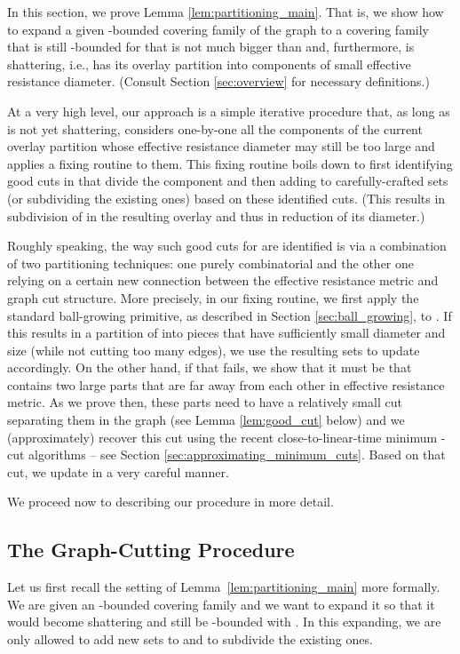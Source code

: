 \documentclass[11pt, letterpaper]{article}
\begin{document}
In this section, we prove Lemma \ref{lem:partitioning_main}. That is, we show how to expand a given -bounded covering family  of the graph  to a covering family  that is still -bounded for  that is not much bigger than  and, furthermore, is shattering, i.e., has its overlay  partition  into components of small effective resistance diameter. (Consult Section \ref{sec:overview} for necessary definitions.)

At a very high level, our approach is a simple iterative procedure that, as long as  is not yet shattering, considers one-by-one all the components  of the current overlay partition  whose effective resistance diameter may still be too large and applies a fixing routine to them. This fixing routine boils down to first identifying good cuts in  that divide the component  and then adding to  carefully-crafted sets (or subdividing the existing ones) based on these identified cuts. (This results in subdivision of  in the resulting overlay  and thus in reduction of its diameter.)

Roughly speaking, the way such good cuts for  are identified is via a combination of two partitioning techniques: one purely combinatorial and the other one relying on a certain new connection between the effective resistance metric and graph cut structure. More precisely, in our fixing routine, we first apply the standard ball-growing primitive, as described in Section \ref{sec:ball_growing}, to . If this results in a partition of  into pieces that have sufficiently small diameter and size (while not cutting too many edges), we use the resulting sets to update  accordingly. On the other hand, if that fails, we show that it must be that  contains two large parts that are far away from each other in effective resistance metric. As we prove then, these parts need to have a relatively small cut separating them in the graph  (see Lemma \ref{lem:good_cut} below) and we (approximately) recover this cut using the recent close-to-linear-time minimum - cut algorithms -- see Section \ref{sec:approximating_minimum_cuts}. Based on that cut, we update  in a very careful manner. 
  
We proceed now to describing our procedure in more detail.

\subsection{The Graph-Cutting Procedure}

Let us first recall the setting of Lemma~\ref{lem:partitioning_main} more formally. We are given an -bounded covering family  and we want to expand it so that it would become shattering and still be -bounded with . In this expanding, we are only allowed to add new sets to  and to subdivide the existing ones.
\end{document}

